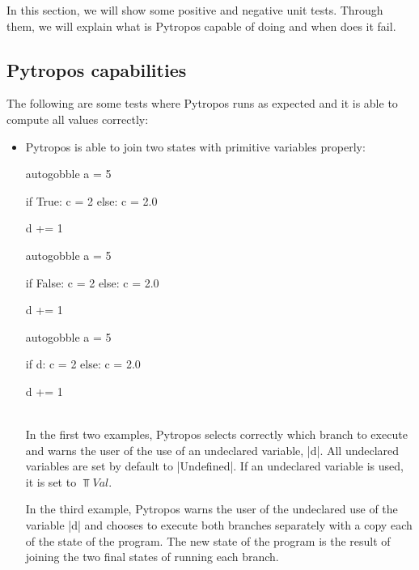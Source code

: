 In this section, we will show some positive and negative unit tests. Through them, we will
explain what is Pytropos capable of doing and when does it fail.

\subsection{Pytropos capabilities}

The following are some tests where Pytropos runs as expected and it is able to compute all values correctly:

\begin{itemize}
\tightlist
\item Pytropos is able to join two states with primitive variables properly:

\begin{minipage}{.25\textwidth}
  \begin{pythoncode*}{autogobble}
    a = 5

    if True:
        c = 2
    else:
        c = 2.0

    d += 1
  \end{pythoncode*}
\end{minipage}\hfill%
\begin{minipage}{.25\textwidth}
  \begin{pythoncode*}{autogobble}
    a = 5

    if False:
        c = 2
    else:
        c = 2.0

    d += 1
  \end{pythoncode*}
\end{minipage}\hfill%
\begin{minipage}{.25\textwidth}
  \begin{pythoncode*}{autogobble}
    a = 5

    if d:
        c = 2
    else:
        c = 2.0

    d += 1
  \end{pythoncode*}
\end{minipage}\\[.4em]

  In the first two examples, Pytropos selects correctly which branch to execute and warns
  the user of the use of an undeclared variable, \pycode|d|.  All undeclared variables are
  set by default to \pycode|Undefined|. If an undeclared variable is used, it is set to
  $\Top{Val}$.

  In the third example, Pytropos warns the user of the undeclared use of the variable
  \pycode|d| and chooses to execute both branches separately with a copy each of the state
  of the program. The new state of the program is the result of joining the two final
  states of running each branch.


\end{itemize}
